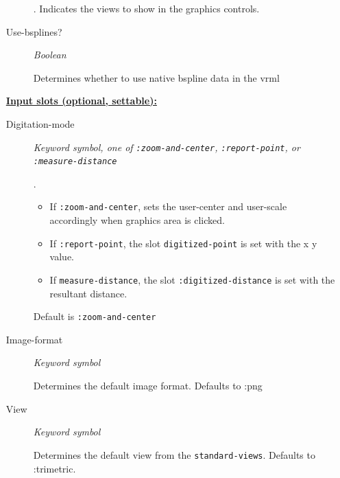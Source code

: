 \documentclass [11pt]{book}
\begin{document}
\begin{itemize}
\begin{description}
.
Indicates the views to show in the graphics controls.




\item [Use-bsplines?]
\emph{Boolean}

 Determines whether to use native bspline data in the vrml




\end{description}






\textbf{
\underline{Input slots (optional, settable):}}

\begin{description}

\item [Digitation-mode]
\emph{Keyword symbol, one of \texttt{:zoom-and-center}, \texttt{:report-point}, or \texttt{:measure-distance}}

.


\begin{itemize}

\item If \texttt{:zoom-and-center}, sets the user-center and user-scale accordingly when graphics
area is clicked.


\item If \texttt{:report-point}, the slot \texttt{digitized-point} is set with the x y value. 


\item If \texttt{measure-distance}, the slot \texttt{:digitized-distance} is set with the resultant distance.


\end{itemize}


Default is \texttt{:zoom-and-center}




\item [Image-format]
\emph{Keyword symbol}

 Determines the default image format. Defaults to :png




\item [View]
\emph{Keyword symbol}

 Determines the default view from the \texttt{standard-views}. Defaults to :trimetric.





\end{description}
\end{itemize}
\end{document}
